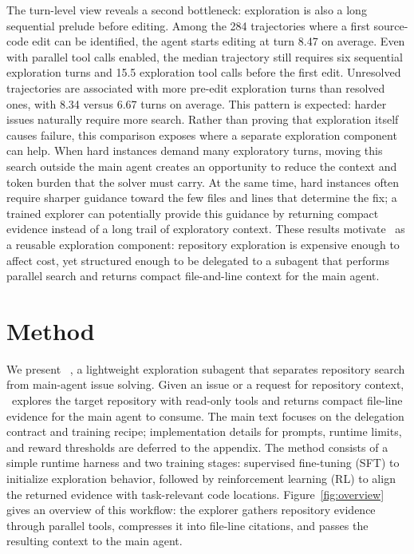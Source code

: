 \documentclass{llmxive}
\providecommand{\approach}{~}
\begin{document}
The turn-level view reveals a second bottleneck: exploration is also a long sequential prelude before editing.
Among the 284 trajectories where a first source-code edit can be identified, the agent starts editing at turn 8.47 on average.
Even with parallel tool calls enabled, the median trajectory still requires six sequential exploration turns and 15.5 exploration tool calls before the first edit.
Unresolved trajectories are associated with more pre-edit exploration turns than resolved ones, with 8.34 versus 6.67 turns on average.
This pattern is expected: harder issues naturally require more search.
Rather than proving that exploration itself causes failure, this comparison exposes where a separate exploration component can help.
When hard instances demand many exploratory turns, moving this search outside the main agent creates an opportunity to reduce the context and token burden that the solver must carry.
At the same time, hard instances often require sharper guidance toward the few files and lines that determine the fix; a trained explorer can potentially provide this guidance by returning compact evidence instead of a long trail of exploratory context.
These results motivate \approach as a reusable exploration component: repository exploration is expensive enough to affect cost, yet structured enough to be delegated to a subagent that performs parallel search and returns compact file-and-line context for the main agent.

\vspace{-2mm}
\section{Method}
\label{sec:method}

\vspace{-2mm}
We present \approach, a lightweight exploration subagent that separates repository search from main-agent issue solving.
Given an issue or a request for repository context, \approach explores the target repository with read-only tools and returns compact file-line evidence for the main agent to consume.
The main text focuses on the delegation contract and training recipe; implementation details for prompts, runtime limits, and reward thresholds are deferred to the appendix.
The method consists of a simple runtime harness and two training stages: supervised fine-tuning (SFT) to initialize exploration behavior, followed by reinforcement learning (RL) to align the returned evidence with task-relevant code locations.
Figure~\ref{fig:overview} gives an overview of this workflow: the explorer gathers repository evidence through parallel tools, compresses it into file-line citations, and passes the resulting context to the main agent.
\end{document}

